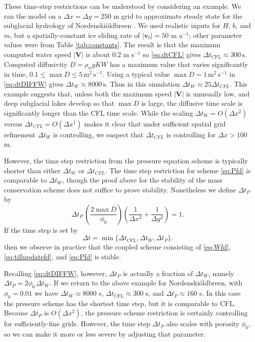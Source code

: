 \documentclass[gmd]{copernicus}   %
\begin{document}
These time-step restrictions can be understood by considering an example.  We ran the model on a $\Delta x = \Delta y = 250$ m grid to approximate steady state for the subglacial hydrology of Nordenski\"oldbreen \citep{vanPeltthesis}.  We used realistic inputs for $H$, $b$, and $m$, but a spatially-constant ice sliding rate of $|\mathbf{v}_b|=50$ m $\text{a}^{-1}$; other parameter values were from Table \ref{tab:constants}.  The result is that the maximum computed water speed $|\mathbf{V}|$ is about $0.2$ m $\text{s}^{-1}$ so \eqref{eq:dtCFL} gives $\Delta t_{\text{CFL}} \approx 300\,\text{s}$.  Computed diffusivity $D = \rho_w g K W$ has a maximum value that varies significantly in time, $0.1 \le \max D \le 5 \,\text{m}^2\,\text{s}^{-1}$.  Using a typical value $\max D=1\,\text{m}^2\,\text{s}^{-1}$ in \eqref{eq:dtDIFFW} gives $\Delta t_W \approx 8000\,\text{s}$.  Thus in this simulation $\Delta t_W \approx 25 \Delta t_{CFL}$.  This example suggests that, unless both the maximum speed $|\mathbf{V}|$ is unusually low, and deep subglacial lakes develop so that $\max D$ is large, the diffusive time scale is significantly longer than the CFL time scale.  While the scaling $\Delta t_W = O(\Delta x^2)$ versus $\Delta t_{CFL} = O(\Delta x^1)$ makes it clear that under sufficient spatial grid refinement $\Delta t_W$ is controlling, we suspect that $\Delta t_{CFL}$ is controlling for $\Delta x > 100$ m.

However, the time step restriction from the pressure equation scheme is typically shorter than either $\Delta t_W$ or $\Delta t_{CFL}$.  The time step restriction for scheme \eqref{eq:Pfd} is comparable to $\Delta t_W$, though the proof above for the stability of the mass conservation scheme does not suffice to prove stability.  Nonetheless we define $\Delta t_P$ by
\begin{equation}
\Delta t_P\, \left(\frac{2 \max D}{\phi_0}\right) \left(\frac{1}{\Delta x^2} + \frac{1}{\Delta y^2}\right) = 1. \label{eq:dtDIFFP}
\end{equation}
If the time step is set by
\begin{equation}
\Delta t = \min\{\Delta t_{\text{CFL}}, \Delta t_W, \Delta t_P\}.  \label{eq:stablecombined}
\end{equation}
then we observe in practice that the coupled scheme consisting of \eqref{eq:Wfd}, \eqref{eq:tillupdatefd}, and \eqref{eq:Pfd} is stable.

Recalling \eqref{eq:dtDIFFW}, however, $\Delta t_P$ is actually a fraction of $\Delta t_W$, namely $\Delta t_P = 2 \phi_0\, \Delta t_W$.  If we return to the above example for Nordenski\"oldbreen, with $\phi_0 = 0.01$ we have $\Delta t_W \approx 8000$ s, $\Delta t_{\text{CFL}} \approx 300$ s, and $\Delta t_P \approx 160$ s.  In this case the pressure scheme has the shortest time step, but it is comparable to CFL.  Because $\Delta t_P$ is $O(\Delta x^2)$, the pressure scheme restriction is certainly controlling for sufficiently-fine grids.  However, the time step $\Delta t_P$ also scales with porosity $\phi_0$, so we can make it more or less severe by adjusting that parameter.
\end{document}

